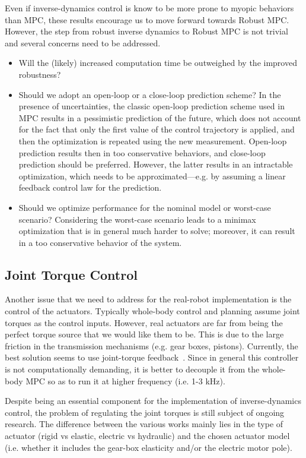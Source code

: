 Even if inverse-dynamics control is know to be more prone to myopic behaviors than MPC, these results encourage us to move forward towards Robust MPC.
However, the step from robust inverse dynamics to Robust MPC is not trivial and several concerns need to be addressed.
\begin{itemize}
\item Will the (likely) increased computation time be outweighed by the improved robustness?
\item Should we adopt an open-loop or a close-loop prediction scheme? In the presence of uncertainties, the classic open-loop prediction scheme used in MPC results in a pessimistic prediction of the future, which does not account for the fact that only the first value of the control trajectory is applied, and then the optimization is repeated using the new measurement. Open-loop prediction results then in too conservative behaviors, and close-loop prediction should be preferred. However, the latter results in an intractable optimization, which needs to be approximated---e.g. by assuming a linear feedback control law for the prediction.
\item Should we optimize performance for the nominal model or worst-case scenario? Considering the worst-case scenario leads to a minimax optimization that is in general much harder to solve; moreover, it can result in a too conservative behavior of the system.
\end{itemize}


\subsection{Joint Torque Control}
Another issue that we need to address for the real-robot implementation is the control of the actuators.
Typically whole-body control and planning assume joint torques as the control inputs.
However, real actuators are far from being the perfect torque source that we would like them to be.
This is due to the large friction in the transmission mechanisms (e.g. gear boxes, pistons).
Currently, the best solution seems to use joint-torque feedback~\cite{Albu-Schaffer2007, Boaventura2012b}.
Since in general this controller is not computationally demanding, it is better to decouple it from the whole-body MPC so as to run it at higher frequency (i.e. 1-3 kHz).

Despite being an essential component for the implementation of inverse-dynamics control, the problem of regulating the joint torques is still subject of ongoing research. The difference between the various works mainly lies in the type of actuator (rigid vs elastic, electric vs hydraulic) and the chosen actuator model (i.e. whether it includes the gear-box elasticity and/or the electric motor pole).

